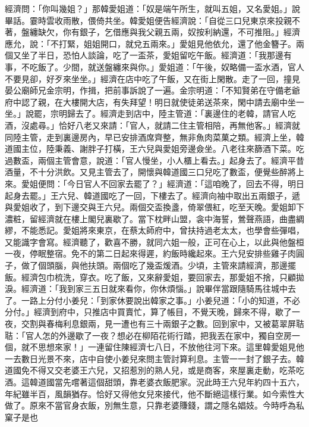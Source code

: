 \begin{showcontents}{}
經濟問：「你叫幾姐？」那韓愛姐道：「奴是端午所生，就叫五姐，又名愛姐。」說畢話。霎時雲收雨散，偎倚共坐。韓愛姐便告經濟說：「自從三口兒東京來投親不著，盤纏缺欠，你有銀子，乞借應與我父親五兩，奴按利納還，不可推阻。」經濟應允，說：「不打緊，姐姐開口，就兌五兩來。」愛姐見他依允，還了他金簪子。兩個又坐了半日，恐怕人談論，吃了一盃茶，愛姐留吃午飯。經濟道：「我那邊有事，不吃飯了。少間，就送盤纏來與你。」愛姐道：「午後，奴略備一盃水酒，官人不要見卻，好歹來坐坐。」經濟在店中吃了午飯，又在街上閑散。走了一回，撞見晏公廟師兄金宗明，作揖，把前事訴說了一遍。金宗明道：「不知賢弟在守備老爺府中認了親，在大樓開大店，有失拜望！明日就使徒弟送茶來，閑中請去廟中坐一坐。」說罷，宗明歸去了。經濟走到店中，陸主管道：「裏邊住的老韓，請官人吃酒，沒處尋。」恰好八老又來請：「官人，就請二住主管相陪，再無他客。」經濟就同陸主管，走到裏邊房內，早已安排酒席齊整，無非魚肉菜菓之類。經濟上坐，韓道國主位，陸秉義、謝胖子打橫，王六兒與愛姐旁邊僉坐。八老往來篩酒下菜。吃過數盃，兩個主管會意，說道：「官人慢坐，小人櫃上看去。」起身去了。經濟平昔酒量，不十分洪飲。又見主管去了，開懷與韓道國三口兒吃了數盃，便覺些醉將上來。愛姐便問：「今日官人不回家去罷了？」經濟道：「這咱晚了，回去不得，明日起身去罷。」王六兒、韓道國吃了一回，下樓去了。經濟向袖中取出五兩銀子，遞與愛姐收了，到下邊交與王六兒。兩個交盃換盞，倚翠偎紅，吃至天晚。愛姐卸下濃粧，留經濟就在樓上閣兒裏歇了。當下枕畔山盟，衾中海誓，鶯聲燕語，曲盡綢繆，不能悉記。愛姐將來東京，在蔡太師府中，曾扶持過老太太，也學會些彈唱，又能識字會寫。經濟聽了，歡喜不勝，就同六姐一般，正可在心上，以此與他盤桓一夜，停眠整宿。免不的第二日起來得遲，約飯時纔起來。王六兒安排些雞子肉圓子，做了個頭腦，與他扶頭。兩個吃了幾盃煖酒。少頃，主管來請經濟，那邊擺飯。經濟包巾梳洗，穿衣。吃了飯，又來辭愛姐，要回家去，那愛姐不捨，只顧拋淚。經濟道：「我到家三五日就來看你，你休煩惱。」說畢伴當跟隨騎馬往城中去了。一路上分付小姜兒：「到家休要說出韓家之事。」小姜兒道：「小的知道，不必分付。」經濟到府中，只推店中買賣忙，算了帳目，不覺天晚，歸來不得，歇了一夜，交割與春梅利息銀兩，見一遭也有三十兩銀子之數。回到家中，又被葛翠屏聐聐：「官人怎的外邊歇了一夜？想必在柳陌花術行踏，把我丟在家中，獨自空房一個，就不思想來家！」一連留住陳經濟七八日，不放他往河下來。這里韓愛姐見他一去數日光景不來，店中自使小姜兒來問主管討算利息。主管一一封了銀子去。韓道國免不得又交老婆王六兒，又招惹別的熟人兒，或是商客，來屋裏走動，吃茶吃酒。這韓道國當先嚐著這個甜頭，靠老婆衣飯肥家。況此時王六兒年約四十五六，年紀雖半百，風韻猶存。恰好又得他女兒來接代，他不斷絕這樣行業。如今索性大做了。原來不當官身衣飯，別無生意，只靠老婆賺錢，謂之隱名娼妓。今時呼為私窠子是也
\end{showcontents}
